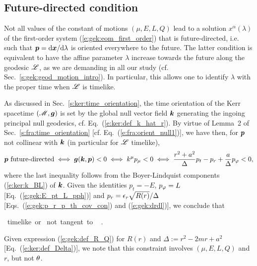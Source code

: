 \subsection{Future-directed condition}

Not all values of the constant of motions $(\mu,E,L,Q)$ lead to a solution
$x^\alpha(\lambda)$ of the first-order system (\ref{e:gek:eom_first_order})
that is future-directed, i.e. such that $\bm{p} = \mathrm{d} \bm{x}/\mathrm{d}\lambda$
is oriented everywhere to the future.
The latter condition is equivalent to have the affine parameter $\lambda$ increase
towards the future along the geodesic $\mathscr{L}$, as we are demanding in all
our study (cf. Sec.~\ref{s:gek:geod_motion_intro}).
In particular, this allows one to identify $\lambda$ with the proper
time when $\mathscr{L}$ is timelike.


As discussed in Sec.~\ref{s:ker:time_orientation}, the time orientation of
the Kerr spacetime $(\mathscr{M},\bm{g})$ is set by the global null
vector field $\bm{k}$ generating the ingoing principal null geodesics, cf. Eq.~(\ref{e:ker:def_k_hat_r}). By virtue of Lemma~2 of Sec.~\ref{s:fra:time_orientation}
[cf. Eq.~(\ref{e:fra:orient_null1})], we have then, for $\bm{p}$ not collinear
with $\bm{k}$ (in particular for $\mathscr{L}$ timelike),
\[
    \bm{p} \ \mbox{future-directed} \iff \bm{g}(\bm{k},\bm{p}) < 0
    \iff k^\mu p_\mu < 0
    \iff \frac{r^2 + a^2}{\Delta} p_t - p_r + \frac{a}{\Delta} p_\varphi < 0 ,
\]
where the last inequality follows from the Boyer-Lindquist components
(\ref{e:ker:k_BL}) of $\bm{k}$.
Given the identities $p_t = -E$, $p_\varphi = L$
[Eq.~(\ref{e:gek:E_pt_L_pph})] and $p_r = \epsilon_r \sqrt{R(r)}/ \Delta $
[Eqs.~(\ref{e:gek:p_r_p_th_cov_con})
and (\ref{e:gek:drdl})], we conclude that
\begin{greybox}
\be \label{e:gek:future_directed}
{\Li \ \mbox{timelike or}\atop
{} \ \mbox{not tangent to} \ \Li} \implies
{} .
\ee
\end{greybox}
Given expression (\ref{e:gek:def_R_Q}) for $R(r)$ and
$\Delta := r^2 - 2m r + a^2$ [Eq.~(\ref{e:ker:def_Delta})],
we note that this constraint involves $(\mu,E,L,Q)$ and $r$, but not $\theta$.

